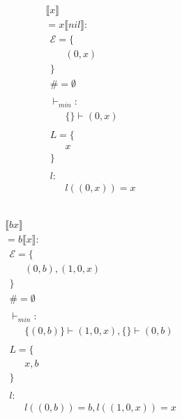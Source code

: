 \begin{align*} 
	 &  & \\ 
	 & \llbracket x \rrbracket & \\ 
	 & = x\llbracket nil \rrbracket:  & \\ 
	 & \ \ \mathcal{{E}}= \{  & \\ 
	 & \qquad (0, x) \\ 
	 & \ \ \} & \\ 
	 & \ \ \# = \emptyset & \\ 
	 & \ \  & \\ 
	 & \ \ \vdash_{{min}}: & \\ 
	 & \qquad \{  \} \vdash (0, x) \\ 
	 & \ \  & \\ 
	 & \ \ L=\{ & \\ 
	 & \qquad x \\ 
	 & \ \ \} & \\ 
	 & \ \  & \\ 
	 & \ \ l: & \\ 
	 & \qquad l((0, x)) = x \\ 
	 & \ \  & \\ 
\end{align*} 

\begin{align*} 
	 &  & \\ 
	 & \llbracket bx \rrbracket & \\ 
	 & = b\llbracket x \rrbracket:  & \\ 
	 & \ \ \mathcal{{E}}= \{  & \\ 
	 & \qquad (0, b), (1, 0, x) \\ 
	 & \ \ \} & \\ 
	 & \ \ \# = \emptyset & \\ 
	 & \ \  & \\ 
	 & \ \ \vdash_{{min}}: & \\ 
	 & \qquad \{ (0, b) \} \vdash (1, 0, x), \{  \} \vdash (0, b) \\ 
	 & \ \  & \\ 
	 & \ \ L=\{ & \\ 
	 & \qquad x, b \\ 
	 & \ \ \} & \\ 
	 & \ \  & \\ 
	 & \ \ l: & \\ 
	 & \qquad l((0, b)) = b, l((1, 0, x)) = x \\ 
	 & \ \  & \\ 
\end{align*} 


